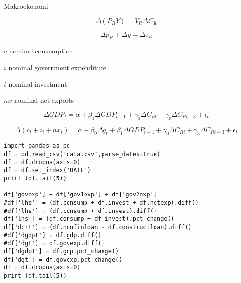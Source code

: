 \documentclass[12pt,fleqn]{article}\usepackage{../../common}
\begin{document}
Makroekonomi

$$ \Delta (P_RY) = V_R\Delta C_R$$

$$ \Delta p_R + \Delta y = \Delta c_R$$




$c$ nominal consumption 

$i$ nominal government expenditure

$i$ nominal investment 

$nx$ nominal net exports

$$ \Delta GDP_t = 
\alpha + \beta_1 \Delta GDP_{t-1} + 
\gamma_0 \Delta C_{Rt} + \gamma_3 \Delta C_{Rt-3} + \epsilon_t 
$$

$$ 
\Delta (c_t + i_t + nx_t) = 
\alpha + \beta_0 \Delta g_t + \beta_1 \Delta GDP_{t-1} + 
\gamma_0 \Delta C_{Rt} + \gamma_3 \Delta C_{Rt-3} + \epsilon_t 
$$


\begin{verbatim}
import pandas as pd
df = pd.read_csv('data.csv',parse_dates=True)
df = df.dropna(axis=0)
df = df.set_index('DATE')
print (df.tail(5))

df['govexp'] = df['gov1exp'] + df['gov2exp']
#df['lhs'] = (df.consump + df.invest + df.netexp).diff()
#df['lhs'] = (df.consump + df.invest).diff()
df['lhs'] = (df.consump + df.invest).pct_change()
df['dcrt'] = (df.nonfinloan - df.constructloan).diff()
#df['dgdpt'] = df.gdp.diff()
#df['dgt'] = df.govexp.diff()
df['dgdpt'] = df.gdp.pct_change()
df['dgt'] = df.govexp.pct_change()
df = df.dropna(axis=0)
print (df.tail(5))
\end{verbatim}
\end{document}
